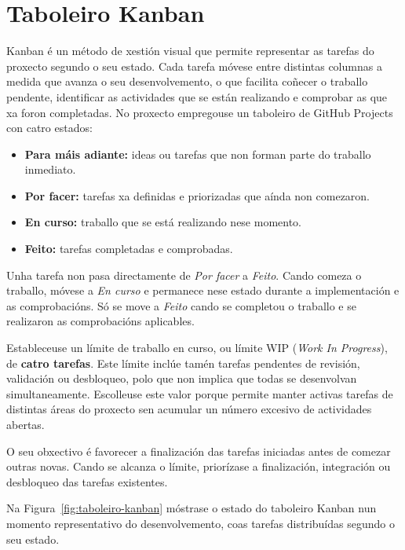 \section{Taboleiro Kanban}
Kanban é un método de xestión visual que permite representar as tarefas do proxecto segundo o seu estado. Cada tarefa móvese entre distintas columnas a medida que avanza o seu desenvolvemento, o que facilita coñecer o traballo pendente, identificar as actividades que se están realizando e comprobar as que xa foron completadas. No proxecto empregouse un taboleiro de GitHub Projects con catro estados:
\begin{itemize}
    \item \textbf{Para máis adiante:} ideas ou tarefas que non forman parte do traballo inmediato.
    \item \textbf{Por facer:} tarefas xa definidas e priorizadas que aínda non comezaron.
    \item \textbf{En curso:} traballo que se está realizando nese momento.
    \item \textbf{Feito:} tarefas completadas e comprobadas.
\end{itemize}

Unha tarefa non pasa directamente de \textit{Por facer} a \textit{Feito}. Cando comeza o traballo, móvese a \textit{En curso} e permanece nese estado durante a implementación e as comprobacións. Só se move a \textit{Feito} cando se completou o traballo e se realizaron as comprobacións aplicables.

Estableceuse un límite de traballo en curso, ou límite WIP (\textit{Work In Progress}), de \textbf{catro tarefas}. Este límite inclúe tamén tarefas pendentes de revisión, validación ou desbloqueo, polo que non implica que todas se desenvolvan simultaneamente. Escolleuse este valor porque permite manter activas tarefas de distintas áreas do proxecto sen acumular un número excesivo de actividades abertas.

O seu obxectivo é favorecer a finalización das tarefas iniciadas antes de comezar outras novas. Cando se alcanza o límite, priorízase a finalización, integración ou desbloqueo das tarefas existentes.

Na Figura~\ref{fig:taboleiro-kanban} móstrase o estado do taboleiro Kanban nun momento representativo do desenvolvemento, coas tarefas distribuídas segundo o seu estado.

%

